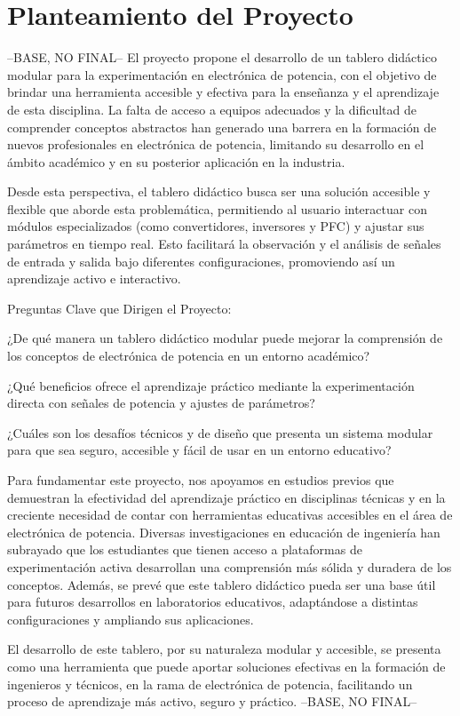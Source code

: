 \section*{Planteamiento del Proyecto}
\justifying

--BASE, NO FINAL--
El proyecto propone el desarrollo de un tablero didáctico modular para la experimentación
en electrónica de potencia, con el objetivo de brindar una herramienta accesible y efectiva
para la enseñanza y el aprendizaje de esta disciplina. La falta de acceso a equipos adecuados
y la dificultad de comprender conceptos abstractos han generado una barrera en la formación
de nuevos profesionales en electrónica de potencia, limitando su desarrollo en el ámbito académico
y en su posterior aplicación en la industria.

Desde esta perspectiva, el tablero didáctico busca ser una solución accesible y flexible
que aborde esta problemática, permitiendo al usuario interactuar con módulos especializados
(como convertidores, inversores y PFC) y ajustar sus parámetros en tiempo real. Esto facilitará
la observación y el análisis de señales de entrada y salida bajo diferentes configuraciones,
promoviendo así un aprendizaje activo e interactivo.

Preguntas Clave que Dirigen el Proyecto:

¿De qué manera un tablero didáctico modular puede mejorar la comprensión de los conceptos
de electrónica de potencia en un entorno académico?

¿Qué beneficios ofrece el aprendizaje práctico mediante la experimentación directa con
señales de potencia y ajustes de parámetros?

¿Cuáles son los desafíos técnicos y de diseño que presenta un sistema modular
para que sea seguro, accesible y fácil de usar en un entorno educativo?

Para fundamentar este proyecto, nos apoyamos en estudios previos que demuestran
la efectividad del aprendizaje práctico en disciplinas técnicas y en la creciente
necesidad de contar con herramientas educativas accesibles en el área de electrónica
de potencia. Diversas investigaciones en educación de ingeniería han subrayado que los
estudiantes que tienen acceso a plataformas de experimentación activa desarrollan una
comprensión más sólida y duradera de los conceptos. Además, se prevé que este tablero
didáctico pueda ser una base útil para futuros desarrollos en laboratorios educativos,
adaptándose a distintas configuraciones y ampliando sus aplicaciones.

El desarrollo de este tablero, por su naturaleza modular y accesible, se presenta
como una herramienta que puede aportar soluciones efectivas en la formación de
ingenieros y técnicos, en la rama de electrónica de potencia, facilitando un proceso de aprendizaje
más activo, seguro y práctico.
--BASE, NO FINAL--